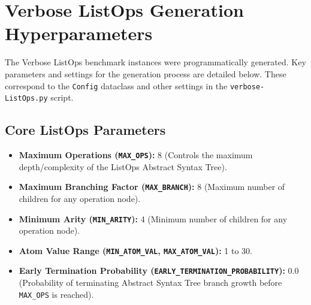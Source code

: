 \documentclass{article}
\begin{document}
\section{Verbose ListOps Generation Hyperparameters}
\label{app:generation_hyperparams}
The Verbose ListOps benchmark instances were programmatically generated. Key parameters and settings for the generation process are detailed below. These correspond to the \texttt{Config} dataclass and other settings in the \texttt{verbose-ListOps.py} script.

\subsection{Core ListOps Parameters}
\begin{itemize}
  \item \textbf{Maximum Operations (\texttt{MAX\_OPS}):} 8 (Controls the maximum depth/complexity of the ListOps Abstract Syntax Tree).
  \item \textbf{Maximum Branching Factor (\texttt{MAX\_BRANCH}):} 8 (Maximum number of children for any operation node).
  \item \textbf{Minimum Arity (\texttt{MIN\_ARITY}):} 4 (Minimum number of children for any operation node).
  \item \textbf{Atom Value Range (\texttt{MIN\_ATOM\_VAL}, \texttt{MAX\_ATOM\_VAL}):} 1 to 30.
  \item \textbf{Early Termination Probability (\texttt{EARLY\_TERMINATION\_PROBABILITY}):} 0.0 (Probability of terminating Abstract Syntax Tree branch growth before \texttt{MAX\_OPS} is reached).
\end{itemize}
\end{document}

